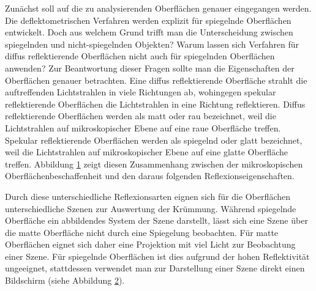 Zunächst soll auf die zu analysierenden Oberflächen genauer eingegangen werden.
Die deflektometrischen Verfahren werden explizit für spiegelnde Oberflächen entwickelt.
Doch aus welchem Grund trifft man die Unterscheidung zwischen spiegelnden und nicht-spiegelnden Objekten?
Warum lassen sich Verfahren für diffus reflektierende Oberflächen nicht auch für spiegelnden Oberflächen anwenden?
Zur Beantwortung dieser Fragen sollte man die Eigenschaften der Oberflächen genauer betrachten.
Eine diffus reflektierende Oberfläche strahlt die auftreffenden Lichtstrahlen in viele Richtungen ab, wohingegen spekular reflektierende Oberflächen die Lichtstrahlen in eine Richtung reflektieren.
Diffus reflektierende Oberflächen werden als matt oder rau bezeichnet, weil die Lichtstrahlen auf mikroskopischer Ebene auf eine raue Oberfläche treffen.
Spekular reflektierende Oberflächen werden als spiegelnd oder glatt bezeichnet, weil die Lichtstrahlen auf mikroskopischer Ebene auf eine glatte Oberfläche treffen.
Abbildung \ref{tikz:abbGlattUndRau} zeigt diesen Zusammenhang zwischen der mikroskopischen Oberflächenbeschaffenheit und den daraus folgenden Reflexionseigenschaften.

{
	\begin{figure}[H]
		\centering
		
		\label{tikz:abbGlattUndRau}
	\end{figure}
}
%
\noindent
Durch diese unterschiedliche Reflexionsarten eignen sich für die Oberflächen unterschiedliche Szenen zur Auswertung der Krümmung.
Während spiegelnde Oberfläche ein abbildendes System der Szene darstellt, lässt sich eine Szene über die matte Oberfläche nicht durch eine Spiegelung beobachten.
Für matte Oberflächen eignet sich daher eine Projektion mit viel Licht zur Beobachtung einer Szene.
Für spiegelnde Oberflächen ist dies aufgrund der hohen Reflektivität ungeeignet, stattdessen verwendet man zur Darstellung einer Szene direkt einen Bildschirm (siehe Abbildung  \ref{tikz:abbDeflektometrieVSProjektion}).

{
	\begin{figure}[H]
		\centering
		
		\label{tikz:abbDeflektometrieVSProjektion}
	\end{figure}
}

